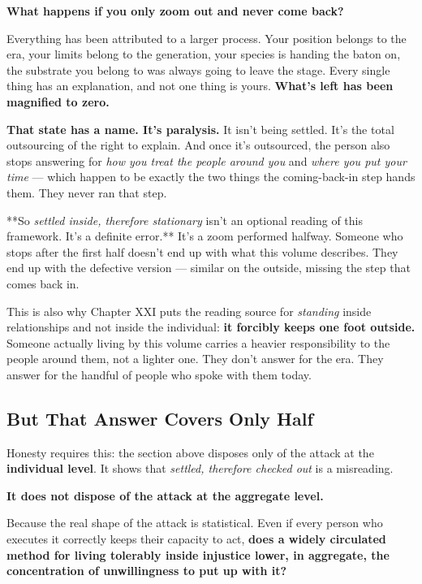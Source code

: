 \documentclass[11pt,a4paper]{article}
\begin{document}
\textbf{What happens if you only zoom out and never come back?}

Everything has been attributed to a larger process. Your position belongs to the era, your limits belong to the generation, your species is handing the baton on, the substrate you belong to was always going to leave the stage. Every single thing has an explanation, and not one thing is yours. \textbf{What's left has been magnified to zero.}

\textbf{That state has a name. It's paralysis.} It isn't being settled. It's the total outsourcing of the right to explain. And once it's outsourced, the person also stops answering for \textit{how you treat the people around you} and \textit{where you put your time} --- which happen to be exactly the two things the coming-back-in step hands them. They never ran that step.

**So \textit{settled inside, therefore stationary} isn't an optional reading of this framework. It's a definite error.** It's a zoom performed halfway. Someone who stops after the first half doesn't end up with what this volume describes. They end up with the defective version --- similar on the outside, missing the step that comes back in.

This is also why Chapter XXI puts the reading source for \textit{standing} inside relationships and not inside the individual: \textbf{it forcibly keeps one foot outside.} Someone actually living by this volume carries a heavier responsibility to the people around them, not a lighter one. They don't answer for the era. They answer for the handful of people who spoke with them today.

\subsection{But That Answer Covers Only Half}

Honesty requires this: the section above disposes only of the attack at the \textbf{individual level}. It shows that \textit{settled, therefore checked out} is a misreading.

\textbf{It does not dispose of the attack at the aggregate level.}

Because the real shape of the attack is statistical. Even if every person who executes it correctly keeps their capacity to act, \textbf{does a widely circulated method for living tolerably inside injustice lower, in aggregate, the concentration of unwillingness to put up with it?}
\end{document}
